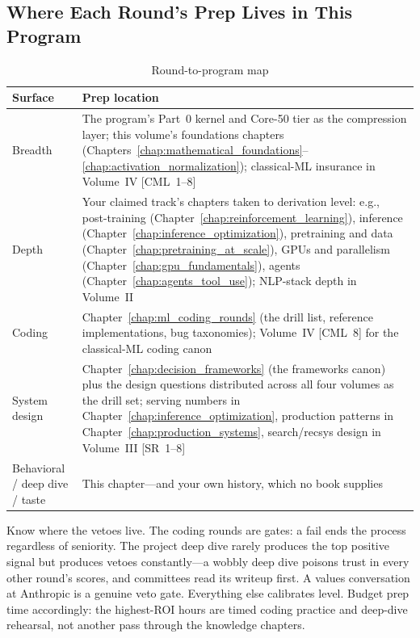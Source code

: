 \subsection{Where Each Round's Prep Lives in This Program}

\begin{table}[H]
\centering
\small
\caption{Round-to-program map}
\label{tab:round_prep_map}
\begin{tabularx}{\textwidth}{lX}
\toprule
\textbf{Surface} & \textbf{Prep location} \\
\midrule
Breadth & The program's Part~0 kernel and Core-50 tier as the compression layer; this volume's foundations chapters (Chapters~\ref{chap:mathematical_foundations}--\ref{chap:activation_normalization}); classical-ML insurance in Volume~IV [CML~1--8] \\
Depth & Your claimed track's chapters taken to derivation level: e.g., post-training (Chapter~\ref{chap:reinforcement_learning}), inference (Chapter~\ref{chap:inference_optimization}), pretraining and data (Chapter~\ref{chap:pretraining_at_scale}), GPUs and parallelism (Chapter~\ref{chap:gpu_fundamentals}), agents (Chapter~\ref{chap:agents_tool_use}); NLP-stack depth in Volume~II \\
Coding & Chapter~\ref{chap:ml_coding_rounds} (the drill list, reference implementations, bug taxonomies); Volume~IV [CML~8] for the classical-ML coding canon \\
System design & Chapter~\ref{chap:decision_frameworks} (the frameworks canon) plus the design questions distributed across all four volumes as the drill set; serving numbers in Chapter~\ref{chap:inference_optimization}, production patterns in Chapter~\ref{chap:production_systems}, search/recsys design in Volume~III [SR~1--8] \\
Behavioral / deep dive / taste & This chapter---and your own history, which no book supplies \\
\bottomrule
\end{tabularx}
\end{table}

\begin{warningbox}
Know where the vetoes live. The coding rounds are gates: a fail ends the process regardless of seniority. The project deep dive rarely produces the top positive signal but produces vetoes constantly---a wobbly deep dive poisons trust in every other round's scores, and committees read its writeup first. A values conversation at Anthropic is a genuine veto gate. Everything else calibrates level. Budget prep time accordingly: the highest-ROI hours are timed coding practice and deep-dive rehearsal, not another pass through the knowledge chapters.
\end{warningbox}


